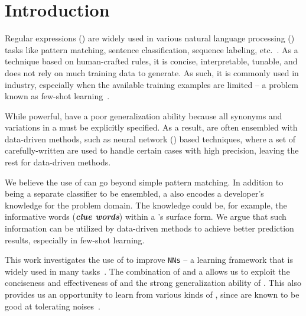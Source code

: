 
\section{Introduction}


Regular expressions (\REs) are widely used in various natural language processing (\NLP) tasks like pattern matching, sentence
classification, sequence labeling, etc.~\cite{chang2014tokensregex}.
As a technique based on human-crafted rules, it is concise, interpretable, tunable, and does not rely on much training data to generate. As
such, it is commonly used in industry, especially when the available training examples are limited -- a problem known as few-shot
learning~\cite{gc2015big}.

While powerful, \REs have a poor generalization ability because all synonyms and variations in a \RE must be explicitly specified. As a
result, %
\REs are often ensembled  with data-driven methods, such as neural network (\NN) based techniques, where a set of carefully-written \REs
are used to handle certain cases with high precision, leaving the rest for data-driven methods.

We believe the use of \REs can go beyond simple pattern matching. In addition to being a separate classifier to be ensembled, a \RE also
encodes a developer's knowledge for the problem domain. The knowledge could be, for example,  the informative words (\textbf{\textit{clue
words}}) within a \RE's surface form. We argue that such information can be utilized by data-driven methods to achieve better prediction
results, especially in few-shot learning.



This work investigates the use of \REs to improve \texttt{NNs} -- a learning framework that is widely used in many \NLP
tasks~\cite{goldberg2017neural}. The combination of \REs and a \NN  allows us to exploit the conciseness and effectiveness of \REs and the
strong generalization ability of \NNs. This also provides us  an opportunity to learn from various kinds of  \REs, since \NNs are known to
be good at tolerating noises~\cite{xie2016disturblabel}.


